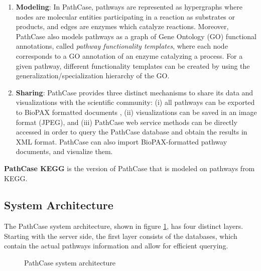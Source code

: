 \begin{enumerate}
    \item \textbf{Modeling}: In PathCase, pathways are represented as
    hypergraphs \cite{Berge-1973} where nodes are molecular entities
    participating in a reaction as substrates or products, and edges are enzymes
    which catalyze reactions. Moreover, PathCase also models pathways as a graph
    of Gene Ontology (GO) functional annotations, called \emph{pathway
    functionality templates}, where each node corresponds to a GO annotation of
    an enzyme catalyzing a process. For a given pathway, different functionality
    templates can be created by using the generalization/specialization
    hierarchy of the GO.

    \item \textbf{Sharing}: PathCase provides three distinct mechanisms to share
    its data and visualizations with the scientific community: (i) all pathways
    can be exported to BioPAX formatted documents \cite{BioPAX}, (ii)
    visualizations can be saved in an image format (JPEG), and (iii) PathCase
    web service methods can be directly accessed in order to query the PathCase
    database and obtain the results in XML format. PathCase can also import
    BioPAX-formatted pathway documents, and visualize them.

\end{enumerate}

\textbf{PathCase KEGG} is the version of PathCase that is modeled on pathways
from KEGG.

\subsection{System Architecture}
\label{sect:pathcase_architecture}

The PathCase system architecture, shown in figure
\ref{fig:pathcase_architecture}, has four distinct layers. Starting with the
server side, the first layer consists of the databases, which contain the actual
pathways information and allow for efficient querying.

\begin{figure}[hbt]
    \caption{\label{fig:pathcase_architecture} PathCase system architecture}
\end{figure}

